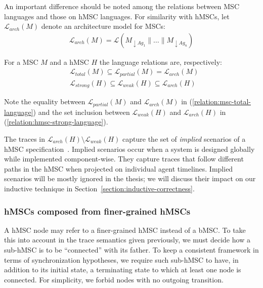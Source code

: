 An important difference should be noted among the relations between MSC languages and those on hMSC languages. For similarity with hMSCs, let $\mathcal{L}_{arch}(M)$ denote an architecture model for MSCs:
\begin{align*}
\mathcal{L}_{arch}(M) = \mathcal{L}(M_{\downarrow Ag_1}\parallel\ldots\parallel M_{\downarrow Ag_n})
\end{align*}

\noindent For a MSC $M$ and a hMSC $H$ the language relations are, respectively:
\begin{align}
&\mathcal{L}_{total}(M) \subseteq \mathcal{L}_{partial}(M) = \mathcal{L}_{arch}(M) \label{relation:msc-total-language}\\
&\mathcal{L}_{strong}(H) \subseteq \mathcal{L}_{weak}(H) \subseteq \mathcal{L}_{arch}(H) \label{relation:hmsc-strong-language}
\end{align}

Note the equality between $\mathcal{L}_{partial}(M)$ and $\mathcal{L}_{arch}(M)$ in (\ref{relation:msc-total-language}) and the set inclusion between $\mathcal{L}_{weak}(H)$ and $\mathcal{L}_{arch}(H)$ in (\ref{relation:hmsc-strong-language}). 

The traces in $\mathcal{L}_{arch}(H) \setminus \mathcal{L}_{weak}(H)$ capture the set of \emph{implied} scenarios of a hMSC specification~\cite{Alur:2000, Uchitel:2004}. Implied scenarios occur when a system is designed globally while implemented component-wise. They capture traces that follow different paths in the hMSC when projected on individual agent timelines. Implied scenarios will be mostly ignored in the thesis; we will discuss their impact on our inductive technique in Section~\ref{section:inductive-correctness}.

\subsubsection*{hMSCs composed from finer-grained hMSCs\label{subsubsection:hMSC-with-sub-hMSC}}

A hMSC node may refer to a finer-grained hMSC instead of a bMSC. To take this into account in the trace semantics given previously, we must decide how a sub-hMSC is to be ``connected'' with its father. To keep a consistent framework in terms of synchronization hypotheses, we require such sub-hMSC to have, in addition to its initial state, a terminating state to which at least one node is connected. For simplicity, we forbid nodes with no outgoing transition. 

